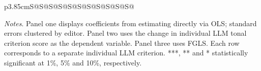\begin{table}
\begin{threeparttable}
\begin{tabular}{p{3.85cm}S@{}S@{}S@{}S@{}S@{}S@{}S@{}S@{}S@{}S@{}S@{}}
            \bottomrule
        \end{tabular}
        \begin{tablenotes}
            \tiny
            \item \textit{Notes}. Panel one displays coefficients from estimating directly via OLS; standard errors clustered by editor. Panel two uses the change in individual LLM tonal criterion score as the dependent variable. Panel three uses FGLS. Each row corresponds to a separate individual LLM criterion. ***, ** and * statistically significant at 1\%, 5\% and 10\%, respectively.
        \end{tablenotes}
    \end{threeparttable}

\end{table}
